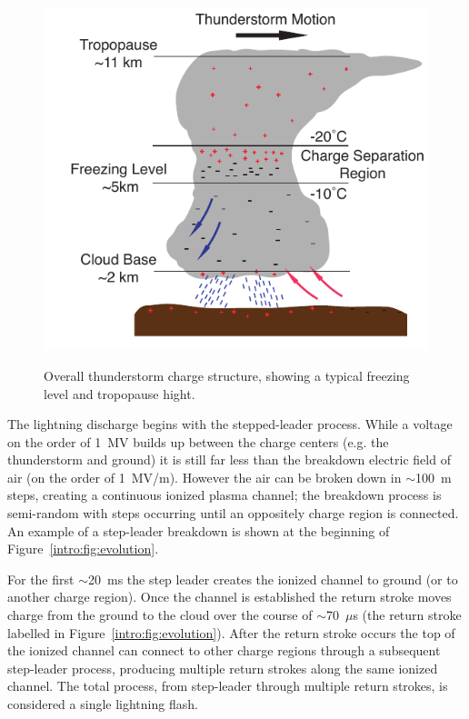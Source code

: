 \begin{figure}[ht!]
	\centering
	\includegraphics[scale=1]{Introduction/Figures/thunderstorm_structure.pdf}\\
	\caption{Overall thunderstorm charge structure, showing a typical freezing level and tropopause hight.}
	\label{intro:fig:thunderstorm}
\end{figure}

The lightning discharge begins with the stepped-leader process.
While a voltage on the order of 1~MV builds up between the charge centers (e.g. the thunderstorm and ground) it is still far less than the breakdown electric field of air (on the order of 1~MV/m).
However the air can be broken down in $\sim$100~m steps, creating a continuous ionized plasma channel; the breakdown process is semi-random with steps occurring until an oppositely charge region is connected.
An example of a step-leader breakdown is shown at the beginning of Figure~\ref{intro:fig:evolution}.

For the first $\sim$20~ms the step leader creates the ionized channel to ground (or to another charge region).
Once the channel is established the return stroke moves charge from the ground to the cloud over the course of $\sim$70~$\mu$s (the return stroke labelled in Figure~\ref{intro:fig:evolution}).
After the return stroke occurs the top of the ionized channel can connect to other charge regions through a subsequent step-leader process, producing multiple return strokes along the same ionized channel.
The total process, from step-leader through multiple return strokes, is considered a single lightning flash.

